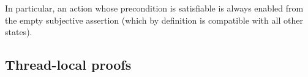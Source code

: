 

		






In particular,
an action whose precondition is satisfiable is always enabled from the
empty subjective assertion (which by definition is compatible with all
other states). 

\subsection{Thread-local proofs}
\label{subsec:threads}

